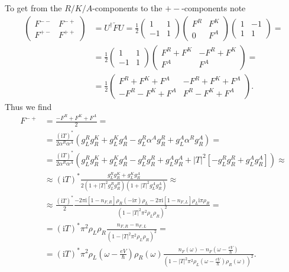 \documentclass[english, parskip=full]{scrartcl}
\newcommand{\kla}{}
\newcommand{\klam}{}
\renewcommand{\i}{\text{i}}
\begin{document}
To get from the $R/K/A$-components to the $+-$-components note 
\begin{align}
\begin{pmatrix}
F^{--} & F^{-+} \\ F^{+-} & F^{++}
\end{pmatrix} &= U^\dagger \check{F} U = \frac{1}{2} \begin{pmatrix}
1 & 1 \\ -1 & 1
\end{pmatrix} \begin{pmatrix}
F^R & F^K \\ 0 & F^A
\end{pmatrix} \begin{pmatrix}
1 & -1 \\ 1 & 1
\end{pmatrix} = \\
&= \frac{1}{2} \begin{pmatrix}
1 & 1 \\ -1 & 1
\end{pmatrix}  \begin{pmatrix}
F^R + F^K & -F^R + F^K \\ F^A & F^A
\end{pmatrix} = \\
&= \frac{1}{2} \begin{pmatrix}
F^R + F^K + F^A & -F^R + F^K + F^A \\ -F^R - F^K + F^A & F^R - F^K + F^A
\end{pmatrix}.
\end{align}
Thus we find
\begin{align}
F^{-+} &= \frac{-F^R + F^K + F^A}{2} = \\
&= \frac{(\i T)^\ast}{2\alpha^R \alpha^A} \kla\left( g_L^Rg_R^K + g_L^Kg_R^A - g_L^R\alpha^Ag_R^R + g_L^A \alpha^R g_R^A \right) = \\
&= \frac{(\i T)^\ast}{2\alpha^R \alpha^A} \kla\left( g_L^Rg_R^K + g_L^Kg_R^A - g_L^R g_R^R + g_L^A g_R^A + |T|^2 \klam\left[ -g_L^R g_R^R + g_L^A g_R^A \right] \right) \approx \\
&\approx (\i T)^\ast \frac{g_L^Rg_R^K + g_L^Kg_R^A}{2\kla\left( 1 + |T|^2 g_L^Rg_R^R \right) \kla\left( 1 + |T|^2 g_L^A g_R^A \right)} \approx \\
&\approx \frac{(\i T)^\ast}{2} \frac{-2\pi\i [1 - n_{F,R}]\rho_R (-\i\pi) \rho_L - 2\pi\i [1 - n_{F,L}] \rho_L \i\pi \rho_R }{\kla\left( 1 - |T|^2 \pi^2 \rho_L\rho_R \right)^2} = \\
&= (\i T)^\ast \pi^2 \rho_L \rho_R \frac{n_{F,R} - n_{F,L}}{\left( 1 - |T|^2 \pi^2 \rho_L\rho_R \right)^2} = \\
&= (\i T)^\ast \pi^2 \rho_L\kla\left( \omega - \frac{eV}{\hbar} \right) \rho_R(\omega) \frac{n_{F}(\omega) - n_{F}\left( \omega - \frac{eV}{\hbar} \right)}{\left( 1 - |T|^2 \pi^2 \rho_L\left( \omega - \frac{eV}{\hbar} \right) \rho_R(\omega) \right)^2}.
\end{align}
\end{document}
